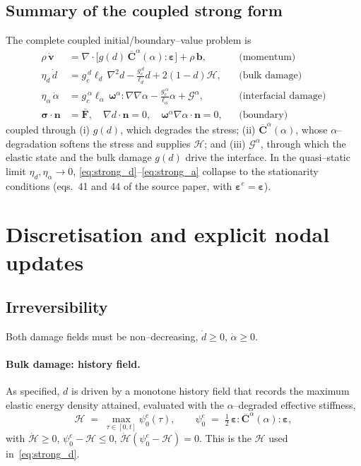 \documentclass[12pt,a4paper]{article}
\newcommand{\bF}{\mathbf{F}}
\newcommand{\bsig}{\boldsymbol{\sigma}}
\newcommand{\beps}{\boldsymbol{\varepsilon}}
\newcommand{\bv}{\mathbf{v}}
\newcommand{\bb}{\mathbf{b}}
\newcommand{\bn}{\mathbf{n}}
\newcommand{\bomega}{\boldsymbol{\omega}}
\newcommand{\Ca}{\overline{\mathbf{C}}^{\alpha}}     %
\begin{document}
	\subsection{Summary of the coupled strong form}

	The complete coupled initial/boundary--value problem is
	\begin{subequations}\label{eq:strongall}
	\begin{align}
		\rho\,\dot{\bv} &= \nabla\cdot\bigl[g(d)\,\Ca(\alpha):\beps\bigr] + \rho\,\bb,
			& &\text{(momentum)} \label{eq:strong_mom}\\[2pt]
		\eta_d\,\dot d &= g_c^{\,d}\ell_d\,\nabla^2 d - \tfrac{g_c^{\,d}}{\ell_d}d + 2(1-d)\mathcal{H},
			& &\text{(bulk damage)} \label{eq:strong_d}\\[2pt]
		\eta_\alpha\,\dot\alpha &= g_c^{\,\alpha}\ell_\alpha\,\bomega^{\alpha}\!:\!\nabla\nabla\alpha
			- \tfrac{g_c^{\,\alpha}}{\ell_\alpha}\alpha + \mathcal{G}^{\alpha},
			& &\text{(interfacial damage)} \label{eq:strong_a}\\[2pt]
		\bsig\cdot\bn &= \bar{\bF},\quad
			\nabla d\cdot\bn=0,\quad \bomega^{\alpha}\nabla\alpha\cdot\bn=0,
			& &\text{(boundary)} \label{eq:strong_bc}
	\end{align}
	\end{subequations}
	coupled through (i) $g(d)$, which degrades the stress; (ii) $\Ca(\alpha)$, whose
	$\alpha$--degradation softens the stress and supplies $\mathcal{H}$; and
	(iii) $\mathcal{G}^{\alpha}$, through which the elastic state and the bulk damage
	$g(d)$ drive the interface. In the quasi--static limit $\eta_d,\eta_\alpha\to0$,
	\eqref{eq:strong_d}--\eqref{eq:strong_a} collapse to the stationarity conditions
	(eqs.~41 and 44 of the source paper, with $\beps^e=\beps$).

	\section{Discretisation and explicit nodal updates}\label{sec:disc}

	\subsection{Irreversibility}

	Both damage fields must be non--decreasing, $\dot d\ge0$, $\dot\alpha\ge0$.

	\paragraph{Bulk damage: history field.}
	As specified, $d$ is driven by a monotone history field that records the maximum
	elastic energy density attained, evaluated with the $\alpha$--degraded effective
	stiffness,
	\begin{equation}\label{eq:history}
		\mathcal{H} \;=\; \max_{\tau\in[0,t]}\psi_0^{e}(\tau),
		\qquad
		\psi_0^{e} \;=\; \tfrac12\,\beps:\Ca(\alpha):\beps,
	\end{equation}
	with $\dot{\mathcal{H}}\ge0$, $\psi_0^{e}-\mathcal{H}\le0$,
	$\dot{\mathcal{H}}(\psi_0^{e}-\mathcal{H})=0$. This is the $\mathcal{H}$ used
	in~\eqref{eq:strong_d}.
\end{document}
